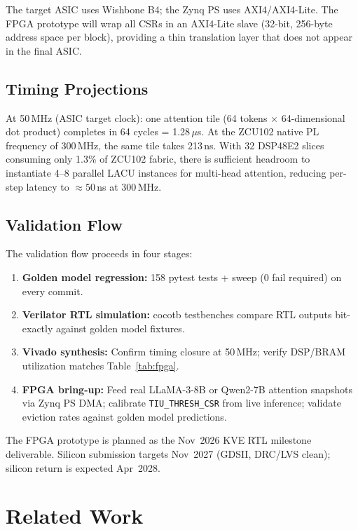 \documentclass[conference]{IEEEtran}
\begin{document}
The target ASIC uses Wishbone B4; the Zynq PS uses AXI4/AXI4-Lite.
The FPGA prototype will wrap all CSRs in an AXI4-Lite slave
(32-bit, 256-byte address space per block), providing a thin
translation layer that does not appear in the final ASIC.

\subsection{Timing Projections}

At 50\,MHz (ASIC target clock): one attention tile (64 tokens $\times$
64-dimensional dot product) completes in 64 cycles = 1.28\,$\mu$s.
At the ZCU102 native PL frequency of 300\,MHz, the same tile takes
213\,ns. With 32 DSP48E2 slices consuming only 1.3\% of ZCU102
fabric, there is sufficient headroom to instantiate 4--8 parallel LACU
instances for multi-head attention, reducing per-step latency to
${\approx}50$\,ns at 300\,MHz.

\subsection{Validation Flow}

The validation flow proceeds in four stages:
\begin{enumerate}
  \item \textbf{Golden model regression:} 158 pytest tests + sweep
        (0 fail required) on every commit.
  \item \textbf{Verilator RTL simulation:} cocotb testbenches compare
        RTL outputs bit-exactly against golden model fixtures.
  \item \textbf{Vivado synthesis:} Confirm timing closure at 50\,MHz;
        verify DSP/BRAM utilization matches Table~\ref{tab:fpga}.
  \item \textbf{FPGA bring-up:} Feed real LLaMA-3-8B or Qwen2-7B
        attention snapshots via Zynq PS DMA; calibrate
        \texttt{TIU\_THRESH\_CSR} from live inference; validate
        eviction rates against golden model predictions.
\end{enumerate}

The FPGA prototype is planned as the Nov~2026 KVE RTL milestone
deliverable. Silicon submission targets Nov~2027 (GDSII, DRC/LVS
clean); silicon return is expected Apr~2028.

\section{Related Work}
\label{sec:related}
\end{document}

